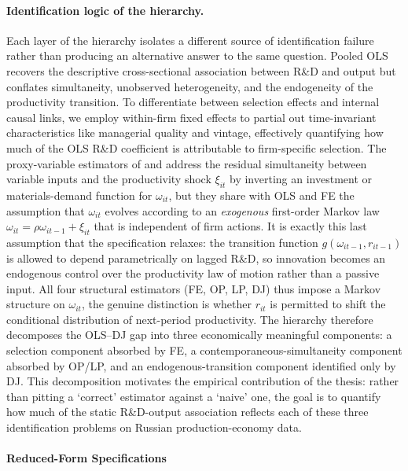 \documentclass[a4paper, 12pt]{article}
\begin{document}
\paragraph{Identification logic of the hierarchy.} Each layer of the hierarchy isolates a different source of identification failure rather than producing an alternative answer to the same question. Pooled OLS recovers the descriptive cross-sectional association between R\&D and output but conflates simultaneity, unobserved heterogeneity, and the endogeneity of the productivity transition. To differentiate between selection effects and internal causal links, we employ within-firm fixed effects to partial out time-invariant characteristics like managerial quality and vintage, effectively quantifying how much of the OLS R\&D coefficient is attributable to firm-specific selection. The proxy-variable estimators of \textcite{olley1992dynamics} and \textcite{levinsohn2003estimating} address the residual simultaneity between variable inputs and the productivity shock $\xi_{it}$ by inverting an investment or materials-demand function for $\omega_{it}$, but they share with OLS and FE the assumption that $\omega_{it}$ evolves according to an \emph{exogenous} first-order Markov law $\omega_{it} = \rho \omega_{it-1} + \xi_{it}$ that is independent of firm actions. It is exactly this last assumption that the \textcite{doraszelski2013r} specification relaxes: the transition function $g(\omega_{it-1}, r_{it-1})$ is allowed to depend parametrically on lagged R\&D, so innovation becomes an endogenous control over the productivity law of motion rather than a passive input. All four structural estimators (FE, OP, LP, DJ) thus impose a Markov structure on $\omega_{it}$, the genuine distinction is whether $r_{it}$ is permitted to shift the conditional distribution of next-period productivity. The hierarchy therefore decomposes the OLS--DJ gap into three economically meaningful components: a selection component absorbed by FE, a contemporaneous-simultaneity component absorbed by OP/LP, and an endogenous-transition component identified only by DJ. This decomposition motivates the empirical contribution of the thesis: rather than pitting a `correct' estimator against a `naive' one, the goal is to quantify how much of the static R\&D-output association reflects each of these three identification problems on Russian production-economy data.


\paragraph{Reduced-Form Specifications}
\end{document}
